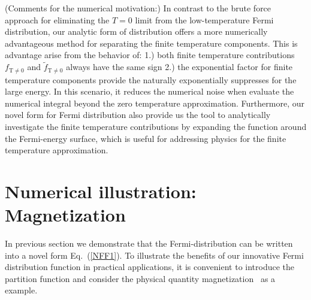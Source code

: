 \documentclass[sn-mathphys,Numbered]{sn-jnl}
\newcommand*{\xred}{\color{red}}
\begin{document}
{\xred(Comments for the numerical motivation:) In contrast to the brute force approach for eliminating the $T=0$ limit from the low-temperature Fermi distribution, our analytic form of distribution offers a more numerically advantageous method for separating the finite temperature components. This is advantage arise from the behavior of: 1.) both finite temperature contributions $f_\mathrm{T\neq0}$ and $\tilde f_\mathrm{T\neq0}$ always have the same sign 2.) the exponential factor for finite temperature components provide the naturally exponentially suppresses for the large energy. In this scenario, it reduces the numerical noise when evaluate the numerical integral beyond the zero temperature approximation. Furthermore, our novel form for Fermi distribution also provide us the tool to analytically investigate the finite temperature contributions by expanding the function around the Fermi-energy surface, which is useful for addressing physics for the finite temperature approximation.}



\section{Numerical illustration: Magnetization}
\label{NumericalResult}
In previous section we demonstrate that the Fermi-distribution can be written into a novel form Eq.~(\ref{NFF1}). To illustrate the benefits of our innovative Fermi distribution function in practical applications, it is convenient to introduce the partition function and consider the physical quantity magnetization~\cite{Melrose:2008abc} as a example.
\end{document}

